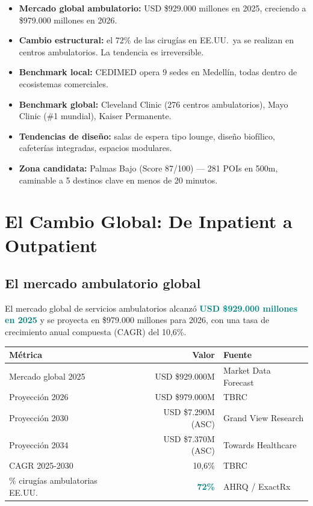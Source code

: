 \documentclass[11pt, a4paper]{article}
\newcommand{\highlight}[1]{\textcolor{teal}{\textbf{#1}}}
\begin{document}
\begin{itemize}[leftmargin=1.5cm]
  \item \textbf{Mercado global ambulatorio:} USD \$929.000 millones en 2025, creciendo a \$979.000 millones en 2026.
  \item \textbf{Cambio estructural:} el 72\% de las cirug\'{i}as en EE.UU.\ ya se realizan en centros ambulatorios. La tendencia es irreversible.
  \item \textbf{Benchmark local:} CEDIMED opera 9 sedes en Medell\'{i}n, todas dentro de ecosistemas comerciales.
  \item \textbf{Benchmark global:} Cleveland Clinic (276 centros ambulatorios), Mayo Clinic (\#1 mundial), Kaiser Permanente.
  \item \textbf{Tendencias de dise\~{n}o:} salas de espera tipo lounge, dise\~{n}o biof\'{i}lico, cafeter\'{i}as integradas, espacios modulares.
  \item \textbf{Zona candidata:} Palmas Bajo (Score 87/100) — 281 POIs en 500m, caminable a 5 destinos clave en menos de 20 minutos.
\end{itemize}

\section{El Cambio Global: De Inpatient a Outpatient}

\subsection{El mercado ambulatorio global}

El mercado global de servicios ambulatorios alcanz\'{o} \highlight{USD \$929.000 millones en 2025} y se proyecta en \$979.000 millones para 2026, con una tasa de crecimiento anual compuesta (CAGR) del 10,6\%.

\begin{center}
\begin{tabular}{@{}lrl@{}}
\toprule
\textbf{M\'{e}trica} & \textbf{Valor} & \textbf{Fuente} \\
\midrule
Mercado global 2025 & USD \$929.000M & Market Data Forecast \\
Proyecci\'{o}n 2026 & USD \$979.000M & TBRC \\
Proyecci\'{o}n 2030 & USD \$7.290M (ASC) & Grand View Research \\
Proyecci\'{o}n 2034 & USD \$7.370M (ASC) & Towards Healthcare \\
CAGR 2025-2030 & 10,6\% & TBRC \\
\% cirug\'{i}as ambulatorias EE.UU. & \highlight{72\%} & AHRQ / ExactRx \\
\bottomrule
\end{tabular}
\end{center}
\end{document}
